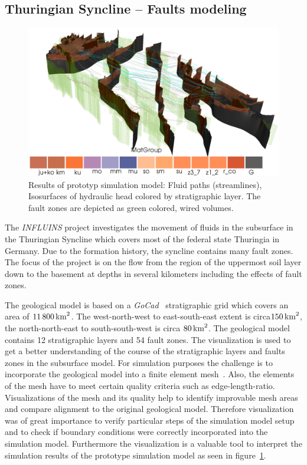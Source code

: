 \documentclass[twocolumn]{svjour3}          %
\begin{document}
\subsection{Thuringian Syncline -- Faults modeling}
\label{thuringian-syncline---faults}

\begin{figure}[htb]
  \includegraphics[width=\linewidth]{images/ThuringianSyncline.png}
\caption{Results of prototyp simulation model: Fluid paths (streamlines),
Isosurfaces of hydraulic head colored by stratigraphic layer. The fault zones
are depicted as green colored, wired volumes.}
\label{fig:ThuringianSyncline}
\end{figure}

The \emph{INFLUINS} project investigates the movement of fluids in the subsurface in the Thuringian Syncline which covers most of the federal state Thuringia in Germany. Due to the formation history, the syncline contains many fault zones. The focus of the project is on the flow from the region of the uppermost soil layer down to the basement at depths in several kilometers including the effects of fault zones.

The geological model is based on a \emph{GoCad}~\cite{web:gocad} stratigraphic grid which covers an area of $11\,800\,\textnormal{km}^2$. The west-north-west to east-south-east extent is circa\linebreak $150\,\textnormal{km}^2$, the north-north-east to south-south-west is circa $80\,\textnormal{km}^2$. The geological model contains 12 stratigraphic layers and 54 fault zones. The visualization is used to get a better understanding of the course of the stratigraphic layers and faults zones in the subsurface model. For simulation purposes the challenge is to incorporate the geological model into a finite element mesh~\cite{zehner:gocad}. Also, the elements of the mesh have to meet certain quality criteria such as edge-length-ratio. Visualizations of the mesh and its quality help to identify improvable mesh areas and compare alignment to the original geological model. Therefore visualization was of great importance to verify particular steps of the simulation model setup and to check if boundary conditions were correctly incorporated into the simulation model. Furthermore the visualization is a valuable tool to interpret the simulation results of the prototype simulation model as seen in figure~\ref{fig:ThuringianSyncline}.
\end{document}
